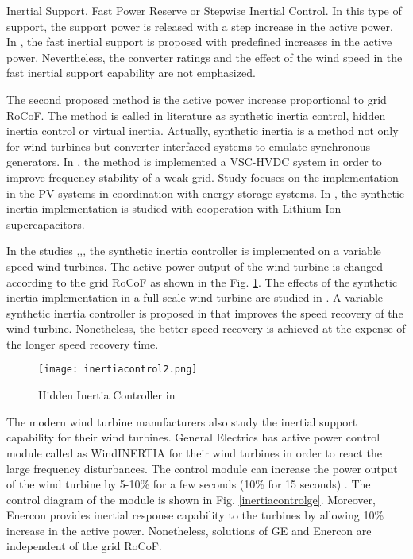Inertial Support, Fast Power Reserve or Stepwise Inertial Control. In this type of support, the support power is released with a step increase in the active power. In \cite{Hansen2014}, the fast inertial support is proposed with predefined increases in the active power. Nevertheless, the converter ratings and the effect of the wind speed in the fast inertial support capability are not emphasized. \par
The second proposed method is the active power increase proportional to grid RoCoF. The method is called in literature as synthetic inertia control, hidden inertia control or
virtual inertia. Actually, synthetic inertia is a method not only for wind turbines but converter interfaced systems to emulate synchronous generators. In \cite{Zhu2013a}, the method is implemented a VSC-HVDC system in order to improve frequency stability of a weak grid. Study \cite{Hernandez2017} focuses on the implementation in the PV systems in coordination with energy storage systems. In \cite{Zhu2018a}, the synthetic inertia implementation is studied with cooperation with Lithium-Ion supercapacitors. \par
In the studies \cite{VanDeVyver2016},\cite{Conroy2008},\cite{Gonzalez-Longatt2013}, the synthetic inertia controller is implemented on a variable speed wind turbines. The active power output of the wind turbine is changed according to the grid RoCoF as shown in the Fig. \ref{inertiacontrol2}. The effects of the synthetic inertia implementation in a full-scale wind turbine are studied in \cite{Gonzalez-Longatt2013}. A variable synthetic inertia controller is proposed in \cite{Bonfiglio2019} that improves the speed recovery of the wind turbine. Nonetheless, the better speed recovery is achieved at the expense of the longer speed recovery time. \par
\begin{figure}[h!]
	\centering
	\texttt{[image: inertiacontrol2.png]}
	\caption{Hidden Inertia Controller in\cite{Gonzalez-Longatt2013}}
	\label{inertiacontrol2}
\end{figure}
The modern wind turbine manufacturers also study the inertial support capability for their wind turbines. General Electrics has active power control module called as WindINERTIA for their wind turbines in order to react the large frequency disturbances. The control module can increase the power output of the wind turbine by 5-10\% for a few seconds (10\% for 15 seconds) \cite{Clark2009}. The control diagram of the module is shown in Fig. \ref{inertiacontrolge}. Moreover, Enercon provides inertial response capability to the turbines by allowing 10\% increase in the active power\cite{Enercon2018}. Nonetheless, solutions of GE and Enercon are independent of the grid RoCoF.\par
